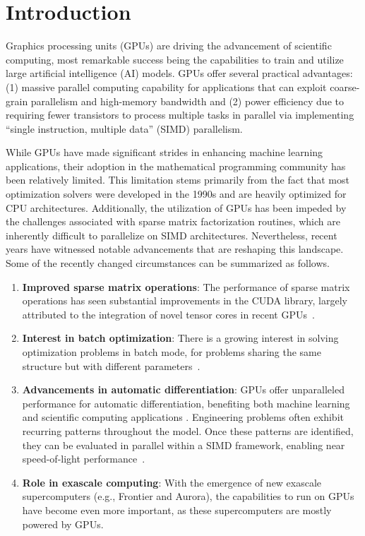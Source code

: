 \section{Introduction} 
Graphics processing units (GPUs) are driving the advancement of scientific computing, most remarkable success being the capabilities to train and utilize large artificial intelligence (AI) models.
GPUs offer several practical advantages: (1) massive parallel computing capability for applications that can exploit coarse-grain parallelism and high-memory bandwidth and (2) power efficiency due to requiring fewer transistors to process multiple tasks in parallel via implementing ``single instruction, multiple data'' (SIMD) parallelism.

While GPUs have made significant strides in enhancing machine learning applications, their adoption in the mathematical programming community has been relatively limited.
This limitation stems primarily from the fact that most optimization solvers were developed in the 1990s and are heavily optimized for CPU architectures.
Additionally, the utilization of GPUs has been impeded by the challenges associated with sparse matrix factorization routines, which are inherently difficult to parallelize on SIMD architectures. Nevertheless, recent years have witnessed notable advancements that are reshaping this landscape.
Some of the recently changed circumstances can be summarized as follows.

\begin{enumerate}
  \item \textbf{Improved sparse matrix operations}: The performance of sparse matrix operations has seen substantial improvements in the CUDA library, largely attributed to the integration of novel tensor cores in recent GPUs~\cite{markidis2018nvidia}.
  \item \textbf{Interest in batch optimization}: There is a growing interest in solving optimization problems in batch mode, for problems sharing the same structure but with different parameters~\cite{amos2017optnet,pineda2022theseus}.
  \item \textbf{Advancements in automatic differentiation}: GPUs offer unparalleled performance for automatic differentiation, benefiting both machine learning ~\cite{jax2018github} and scientific computing applications \cite{enzyme2021}. Engineering problems often exhibit recurring patterns throughout the model. Once these patterns are identified, they can be evaluated in parallel within a SIMD framework, enabling near speed-of-light performance~\cite{shin2023accelerating}.
  \item \textbf{Role in exascale computing}: With the emergence of new exascale supercomputers (e.g., Frontier and Aurora), the capabilities to run on GPUs have become even more important, as these supercomputers are mostly powered by GPUs.
\end{enumerate}

